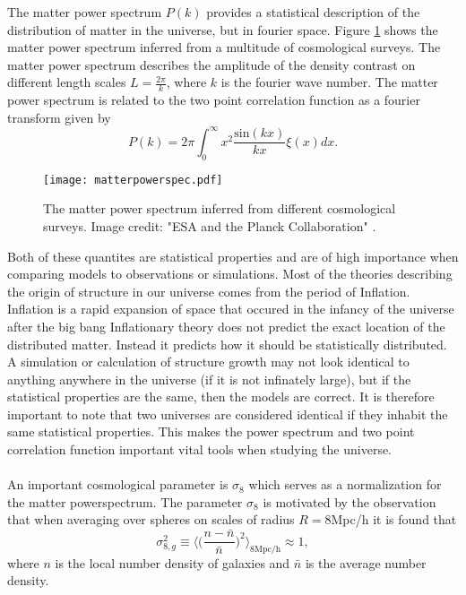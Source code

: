 The matter power spectrum $P(k)$ provides a statistical description of the
distribution of matter in the universe, but in fourier space. Figure
\ref{fig:matterpowerspec} shows the matter power spectrum inferred from a multitude
of cosmological surveys. The matter power spectrum describes the amplitude of 
the density contrast on different length scales $L=\frac{2\pi}{k}$, where $k$ is
the fourier wave number. The matter power spectrum is related to the two point
correlation function as a fourier transform given by
\begin{equation}
    P(k)=2\pi\int_0^\infty x^2\frac{\mathrm{sin}(kx)}{kx}\xi(x)dx.
\end{equation}
\begin{figure}[htbp]
    \texttt{[image: matterpowerspec.pdf]}
    \caption{The matter power spectrum inferred from different cosmological surveys. Image credit: "ESA and the Planck Collaboration" \cite{2020}.}
    \label{fig:matterpowerspec}
\end{figure}
Both of these quantites are statistical properties and are of high importance
when comparing models to observations or simulations. Most of the theories describing 
the origin of structure in our universe comes from the period of Inflation. Inflation is a rapid expansion
of space that occured in the infancy of the universe after the big bang
Inflationary theory does not predict the exact location of the distributed matter.
Instead it predicts how it should be statistically distributed.
A simulation or calculation of structure growth may
not look identical to anything anywhere in the universe (if it is not infinately
large), but if the statistical properties are the same, then the models are
correct. It is therefore important to
note that two universes are considered identical if they inhabit the same
statistical properties. This makes the power spectrum and two point correlation function
important vital tools when studying the universe.
\\\\\indent
An important cosmological parameter is $\sigma_8$ which serves as a normalization for the matter powerspectrum. The parameter $\sigma_8$ is motivated by the observation that when averaging over spheres on scales of radius $R=8$Mpc/h it is found that
\begin{equation}
    \sigma_{8,g}^2\equiv\Big\langle\Big(\frac{n-\bar{n}}{\bar{n}}\Big)^2\Big\rangle_{8\mathrm{Mpc/h}}\approx1,
\end{equation}
where $n$ is the local number density of galaxies and $\bar{n}$ is the average number density.
